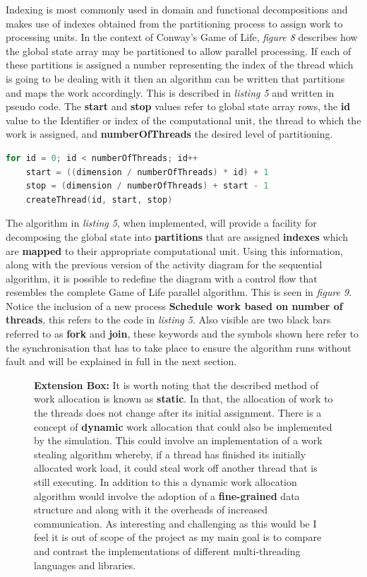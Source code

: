 \documentclass[11pt]{article} %
\begin{document}
Indexing is most commonly used in domain and functional decompositions and makes use of indexes obtained from the partitioning process to assign work to processing units. In the context of Conway's Game of Life, {\it figure 8} describes how the global state array may be partitioned to allow parallel processing. If each of these partitions is assigned a number representing the index of the thread which is going to be dealing with it then an algorithm can be written that partitions and maps the work accordingly. This is described in {\it listing 5} and written in pseudo code. The {\bf start} and {\bf stop} values refer to global state array rows, the {\bf id} value to the Identifier or index of the computational unit, the thread to which the work is assigned, and {\bf numberOfThreads} the desired level of partitioning.
\begin{lstlisting}[language=C, caption={Pseudo Domain Decomposition and Thread Mapping Algorithm}]
for id = 0; id < numberOfThreads; id++
    start = ((dimension / numberOfThreads) * id) + 1
    stop = (dimension / numberOfThreads) + start - 1
    createThread(id, start, stop)
\end{lstlisting}
The algorithm in {\it listing 5}, when implemented, will provide a facility for decomposing the global state into {\bf partitions} that are assigned {\bf indexes} which are {\bf mapped} to their appropriate computational unit. Using this information, along with the previous version of the activity diagram for the sequential algorithm, it is possible to redefine the diagram with a control flow that resembles the complete Game of Life parallel algorithm. This is seen in {\it figure 9}. Notice the inclusion of a new process {\bf Schedule work based on number of threads}, this refers to the code in {\it listing 5}. Also visible are two black bars referred to as {\bf fork} and {\bf join}, these keywords and the symbols shown here refer to the synchronisation that has to take place to ensure the algorithm runs without fault and will be explained in full in the next section.
\smallskip
\begin{figure}
\begin{mdframed}
{\bf Extension Box:} It is worth noting that the described method of work allocation is known as {\bf static}. In that, the allocation of work to the threads does not change after its initial assignment. There is a concept of {\bf dynamic} work allocation that could also be implemented by the simulation. This could involve an implementation of a work stealing algorithm whereby, if a thread has finished its initially allocated work load, it could steal work off another thread that is still executing. In addition to this a dynamic work allocation algorithm would involve the adoption of a {\bf fine-grained} data structure and along with it the overheads of increased communication.\cite[p16]{ref14} As interesting and challenging as this would be I feel it is out of scope of the project as my main goal is to compare and contrast the implementations of different multi-threading languages and libraries.
\end{mdframed}
\end{figure}
\end{document}
